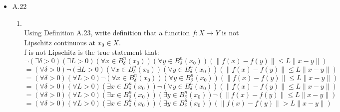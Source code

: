 \documentclass[12pt,letter]{article}
\begin{document}
\begin{itemize}
\item A.22
  \begin{enumerate}
  \item\\
    Using Definition A.23, write definition that a function $f:X \rightarrow Y$ is not Lipschitz continuous at $x_0 \in X$.\\
    f is not Lipschitz is the true statement that:\\
    $\neg(\exists \delta>0)(\exists L>0)(\forall x \in B_{\delta}^n(x_0))(\forall y \in B_{\delta}^n(x_0))(\|f(x)-f(y)\| \leq L \|x-y\|)$\\
    $=(\forall \delta>0)\neg(\exists L>0)(\forall x \in B_{\delta}^n(x_0))(\forall y \in B_{\delta}^n(x_0))(\|f(x)-f(y)\| \leq L \|x-y\|)$\\
    $=(\forall \delta>0)(\forall L>0)\neg(\forall x \in B_{\delta}^n(x_0))(\forall y \in B_{\delta}^n(x_0))(\|f(x)-f(y)\| \leq L \|x-y\|)$\\
    $=(\forall \delta>0)(\forall L>0)(\exists x \in B_{\delta}^n(x_0))\neg(\forall y \in B_{\delta}^n(x_0))(\|f(x)-f(y)\| \leq L \|x-y\|)$\\
    $=(\forall \delta>0)(\forall L>0)(\exists x \in B_{\delta}^n(x_0))(\exists y \in B_{\delta}^n(x_0))\neg(\|f(x)-f(y)\| \leq L \|x-y\|)$\\
    $=(\forall \delta>0)(\forall L>0)(\exists x \in B_{\delta}^n(x_0))(\exists y \in B_{\delta}^n(x_0))(\|f(x)-f(y)\| > L \|x-y\|)$\\
    

\end{enumerate}
\end{itemize}
\end{document}
